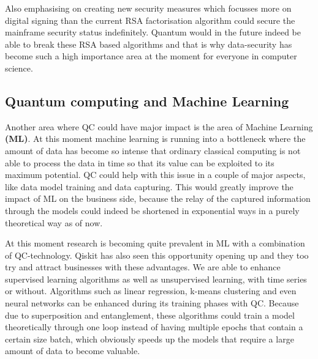 Also emphasising on creating new security measures which focusses more on digital signing than the current RSA factorisation algorithm could secure the mainframe security status indefinitely. Quantum would in the future indeed be able to break these RSA based algorithms and that is why data-security has become such a high importance area at the moment for everyone in computer science.

\subsection{Quantum computing and Machine Learning}

Another area where QC could have major impact is the area of Machine Learning \textbf{(ML)}. At this moment machine learning is running into a bottleneck where the amount of data has become so intense that ordinary classical computing is not able to process the data in time so that its value can be exploited to its maximum potential. QC could help with this issue in a couple of major aspects, like data model training and data capturing. This would greatly improve the impact of ML on the business side, because the relay of the captured information through the models could indeed be shortened in exponential ways in a purely theoretical way as of now. \autocite{Biamonte2017}

At this moment research is becoming quite prevalent in ML with a combination of QC-technology. Qiskit has also seen this opportunity opening up and they too try and attract businesses with these advantages. We are able to enhance supervised learning algorithms as well as unsupervised learning, with time series or without. Algorithms such as linear regression, k-means clustering and even neural networks can be enhanced during its training phases with QC. Because due to superposition and entanglement, these algorithms could train a model theoretically through one loop instead of having multiple epochs that contain a certain size batch, which obviously speeds up the models that require a large amount of data to become valuable.



